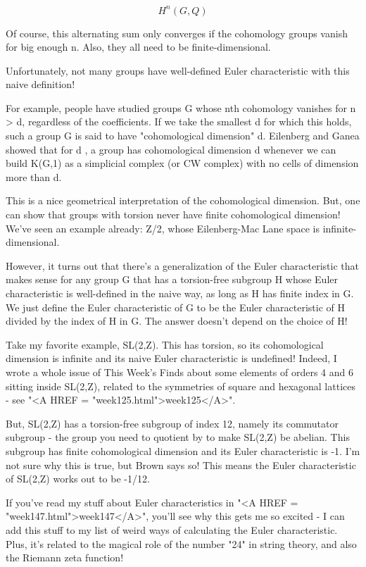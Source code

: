 $$

H^{n}(G,Q)
$$
    

Of course, this alternating sum only converges if the cohomology
groups vanish for big enough n.  Also, they all need to be 
finite-dimensional.

Unfortunately, not many groups have well-defined Euler characteristic
with this naive definition!  

For example, people have studied groups G whose nth cohomology vanishes
for n > d, regardless of the coefficients.  If we take the smallest
d for which this holds, such a group G is said to have "cohomological 
dimension" d.  Eilenberg and Ganea showed that for d , a group has 
cohomological dimension d whenever we can build K(G,1) as a simplicial 
complex (or CW complex) with no cells of dimension more than d.   

This is a nice geometrical interpretation of the cohomological dimension.  
But, one can show that groups with torsion never have finite cohomological
dimension!  We've seen an example already: Z/2, whose Eilenberg-Mac Lane
space is infinite-dimensional.

However, it turns out that there's a generalization of the Euler 
characteristic that makes sense for any group G that has a torsion-free 
subgroup H whose Euler characteristic is well-defined in the naive way, 
as long as H has finite index in G.  We just define the Euler characteristic
of G to be the Euler characteristic of H divided by the index of H in G.
The answer doesn't depend on the choice of H!

Take my favorite example, SL(2,Z).  This has torsion, so its cohomological
dimension is infinite and its naive Euler characteristic is undefined!  
Indeed, I wrote a whole issue of This Week's Finds about some elements of 
orders 4 and 6 sitting inside SL(2,Z), related to the symmetries of square 
and hexagonal lattices - see "<A HREF = "week125.html">week125</A>".   

But, SL(2,Z) has a torsion-free subgroup of index 12, namely its
commutator subgroup - the group you need to quotient by to make SL(2,Z)
be abelian.  This subgroup has finite cohomological dimension and its
Euler characteristic is -1.  I'm not sure why this is true, but Brown says
so!  This means the Euler characteristic of SL(2,Z) works out to be -1/12.  

If you've read my stuff about Euler characteristics in "<A HREF = "week147.html">week147</A>", you'll
see why this gets me so excited - I can add this stuff to my list of
weird ways of calculating the Euler characteristic.  Plus, it's related 
to the magical role of the number "24" in string theory, and also the 
Riemann zeta function!

